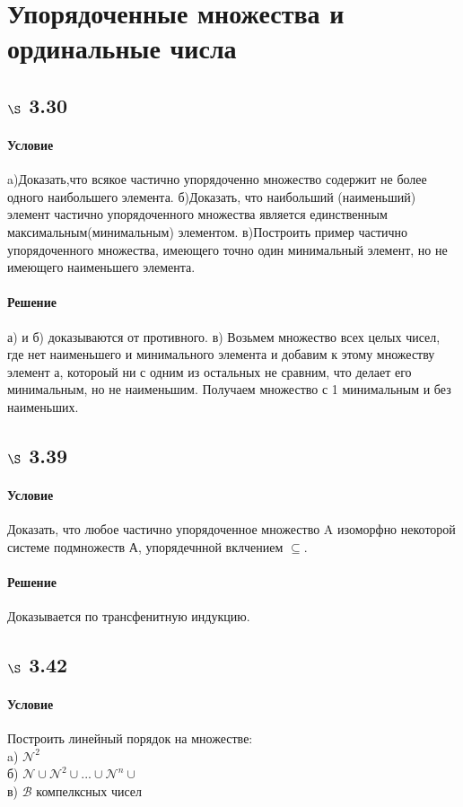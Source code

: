 \documentclass[a4paper,12pt]{article}
\begin{document}
\section{Упорядоченные множества и ординальные числа}
\subsection*{$\S$ 3.30}
\paragraph*{Условие}
a)Доказать,что всякое частично упорядоченно множество содержит не более одного наибольшего элемента.
б)Доказать, что наибольший (наименьший) элемент частично упорядоченного множества является единственным максимальным(минимальным) элементом.
в)Построить пример частично упорядоченного множества, имеющего точно один минимальный элемент, но не имеющего наименьшего элемента.
\paragraph*{Решение}
а) и б) доказываются от противного.
в) Возьмем множество всех целых чисел, где нет наименьшего и минимального элемента и добавим к этому множеству элемент а, котороый ни с одним из остальных не сравним, что делает его минимальным, но не наименьшим. Получаем множество с 1 минимальным и без наименьших.
\subsection*{$\S$ 3.39}
\paragraph*{Условие}
Доказать, что любое частично упорядоченное множество A изоморфно некоторой системе подмножеств А, упорядечнной вклчением $ \subseteq $.
\paragraph*{Решение}
Доказывается по трансфенитную индукцию.

\subsection*{$\S$ 3.42}
\paragraph*{Условие}
Построить линейный порядок на множестве:\\
a) $ \mathscr{N}^2 $\\
б) $ \mathscr{N} \cup \mathscr{N}^2 \cup ... \cup \mathscr{N}^n \cup $\\
в) $ \mathscr{B}$ компелксных чисел
\end{document}
